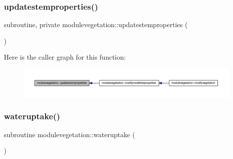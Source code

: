 \subsubsection{\texorpdfstring{updatestemproperties()}{updatestemproperties()}}
{\footnotesize\ttfamily subroutine, private modulevegetation\+::updatestemproperties (\begin{DoxyParamCaption}{ }\end{DoxyParamCaption})\hspace{0.3cm}{\ttfamily [private]}}

Here is the caller graph for this function\+:\nopagebreak
\begin{figure}[H]
\begin{center}
\leavevmode
\includegraphics[width=350pt]{namespacemodulevegetation_ac544594c050d3fcb7a12971817350194_icgraph}
\end{center}
\end{figure}
\mbox{\label{namespacemodulevegetation_a8970a84682188f12c5a7e3c69fdbc853}} 
\subsubsection{\texorpdfstring{wateruptake()}{wateruptake()}}
{\footnotesize\ttfamily subroutine modulevegetation\+::wateruptake (\begin{DoxyParamCaption}{ }\end{DoxyParamCaption})\hspace{0.3cm}{\ttfamily [private]}}

